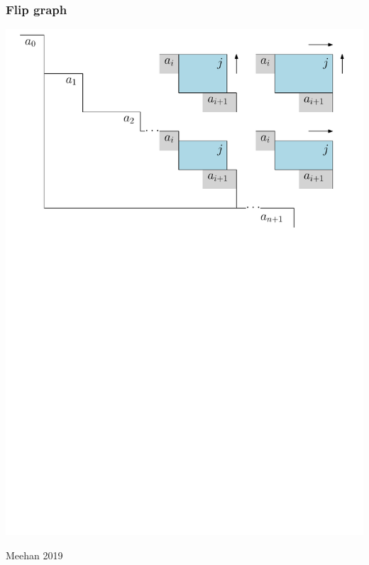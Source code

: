 \documentclass[11pt]{beamer}%
\newcommand{\green}{\color{darkgreen}}
\newcommand{\auth}[1]{{\green\hfill{\footnotesize #1}}}
\begin{document}
\begin{frame}
  \frametitle{Flip graph}
  \begin{center}
    \includegraphics[page=2, height=.8\textheight]{gamma-forward.pdf}
  \end{center}
  \auth{Meehan 2019}
\end{frame}
\end{document}
